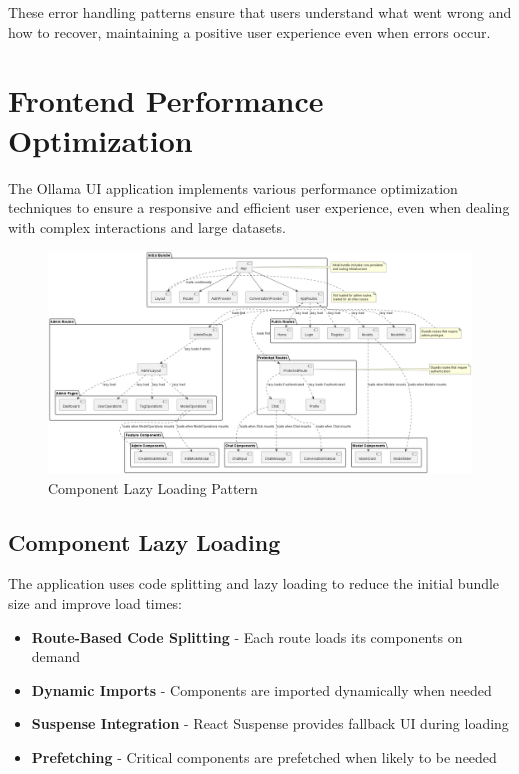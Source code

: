 These error handling patterns ensure that users understand what went wrong and how to recover, maintaining a positive user experience even when errors occur.

\section{Frontend Performance Optimization}

The Ollama UI application implements various performance optimization techniques to ensure a responsive and efficient user experience, even when dealing with complex interactions and large datasets.

\begin{figure}[p]
    \centering
    \includegraphics[width=\textwidth]{./Chapter07/figures/component_lazy_loading.png}
    \caption{Component Lazy Loading Pattern}
    \label{fig:component-lazy-loading}
\end{figure}
\clearpage

\subsection{Component Lazy Loading}

The application uses code splitting and lazy loading to reduce the initial bundle size and improve load times:

\begin{itemize}
  \item \textbf{Route-Based Code Splitting} - Each route loads its components on demand
  \item \textbf{Dynamic Imports} - Components are imported dynamically when needed
  \item \textbf{Suspense Integration} - React Suspense provides fallback UI during loading
  \item \textbf{Prefetching} - Critical components are prefetched when likely to be needed
\end{itemize}

